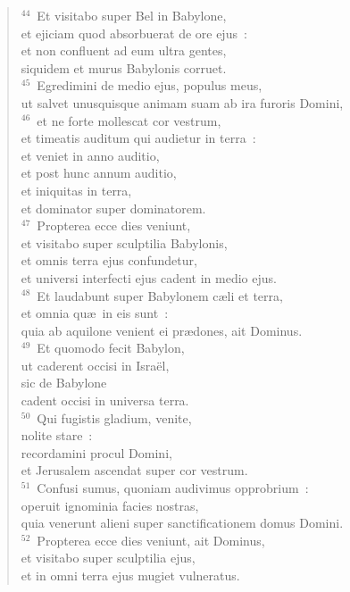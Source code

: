 \begin{verse}
${}^{44}$~Et visitabo super Bel in Babylone,\\ et ejiciam quod absorbuerat de ore ejus~:\\ et non confluent ad eum ultra gentes,\\ siquidem et murus Babylonis corruet.\\
${}^{45}$~Egredimini de medio ejus, populus meus,\\ ut salvet unusquisque animam suam ab ira furoris Domini,\\
${}^{46}$~et ne forte mollescat cor vestrum,\\ et timeatis auditum qui audietur in terra~:\\ et veniet in anno auditio,\\ et post hunc annum auditio,\\ et iniquitas in terra,\\ et dominator super dominatorem.\\
${}^{47}$~Propterea ecce dies veniunt,\\ et visitabo super sculptilia Babylonis,\\ et omnis terra ejus confundetur,\\ et universi interfecti ejus cadent in medio ejus.\\
${}^{48}$~Et laudabunt super Babylonem c\ae li et terra,\\ et omnia qu\ae\ in eis sunt~:\\ quia ab aquilone venient ei pr\ae dones, ait Dominus.\\
${}^{49}$~Et quomodo fecit Babylon,\\ ut caderent occisi in Isra\"el,\\ sic de Babylone\\ cadent occisi in universa terra.\\
${}^{50}$~Qui fugistis gladium, venite,\\ nolite stare~:\\ recordamini procul Domini,\\ et Jerusalem ascendat super cor vestrum.\\
${}^{51}$~Confusi sumus, quoniam audivimus opprobrium~:\\ operuit ignominia facies nostras,\\ quia venerunt alieni super sanctificationem domus Domini.\\
${}^{52}$~Propterea ecce dies veniunt, ait Dominus,\\ et visitabo super sculptilia ejus,\\ et in omni terra ejus mugiet vulneratus.\\

\end{verse}
